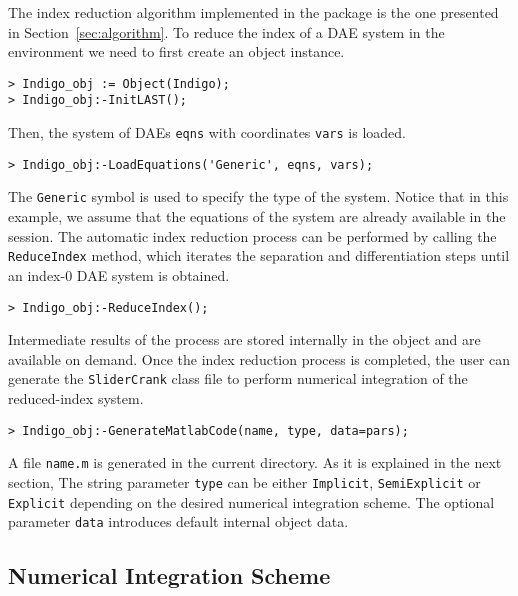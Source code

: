 The index reduction algorithm implemented in the \Indigo{} \Maple{} package is the one presented in Section~\ref{sec:algorithm}. To reduce the index of a \ac{DAE} system in the \Maple{} environment we need to first create an \Indigo{} object instance.
%
\begin{verbatim}
> Indigo_obj := Object(Indigo);
> Indigo_obj:-InitLAST();
\end{verbatim}
%
Then, the system of \acp{DAE} \texttt{eqns} with coordinates \texttt{vars} is loaded.
%
\begin{verbatim}
> Indigo_obj:-LoadEquations('Generic', eqns, vars);
\end{verbatim}
%
The \texttt{Generic} symbol is used to specify the type of the system. Notice that in this example, we assume that the equations of the system are already available in the \Maple{} session. The automatic index reduction process can be performed by calling the \texttt{ReduceIndex} method, which iterates the separation and differentiation steps until an index-$0$ \ac{DAE} system is obtained.
%
\begin{verbatim}
> Indigo_obj:-ReduceIndex();
\end{verbatim}
%
Intermediate results of the process are stored internally in the \Indigo{} object and are available on demand. Once the index reduction process is completed, the user can generate the \texttt{SliderCrank} \Matlab{} class file to perform numerical integration of the reduced-index system.
%
\begin{verbatim}
> Indigo_obj:-GenerateMatlabCode(name, type, data=pars);
\end{verbatim}
%
A file \texttt{name.m} is generated in the current directory. As it is explained in the next section, The string parameter \texttt{type} can be either \texttt{Implicit}, \texttt{SemiExplicit} or \texttt{Explicit} depending on the desired numerical integration scheme. The optional parameter \texttt{data} introduces default internal object data.

\subsection{Numerical Integration Scheme}

